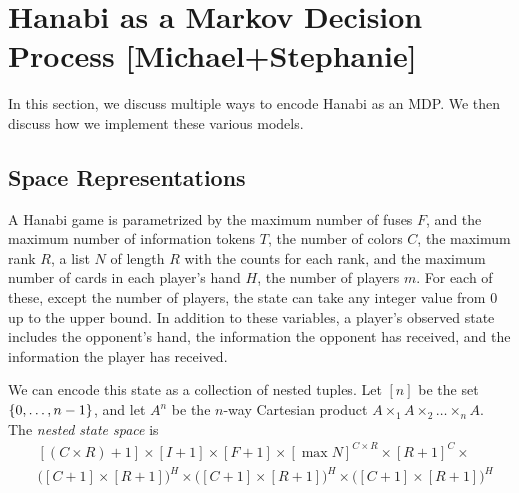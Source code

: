 \section{Hanabi as a Markov Decision Process [Michael+Stephanie]}\label{sec:hanabimdp}

In this section, we discuss multiple ways to encode Hanabi as an MDP. We then
discuss how we implement these various models.

\subsection{Space Representations}

A Hanabi game is parametrized by the maximum number of fuses $F$, and the
maximum number of information tokens $T$, the number of colors $C$, the maximum
rank $R$, a list $N$ of length $R$ with the counts for each rank, and the
maximum number of cards in each player's hand $H$, the number of players $m$.
For each of these, except the number of players, the state can take any integer
value from 0 up to the upper bound. In addition to these variables, a player's
observed state includes the opponent's hand, the information the opponent has
received, and the information the player has received.

We can encode this state as a collection of nested tuples. Let $[n]$ be the set
$\left\{0, \ldots, n-1\right\}$, and let $A^n$ be the $n$-way Cartesian product $A
\times_1 A \times_2 \ldots \times_n A$.
The \emph{nested state space} is 
\begin{align*}
    &[(C \times R) + 1] \times
  [I + 1] \times
  [F + 1] \times
  {[\max{N}]}^{C \times R}
  \times
  {[R + 1]}^{C} \times \\
    &{\bigl([C + 1] \times [R + 1]\bigr)}^{H}
  \times {\bigl([C + 1] \times [R + 1]\bigr)}^{H}
  \times {\bigl([C + 1] \times [R + 1]\bigr)}^{H}
\end{align*}

